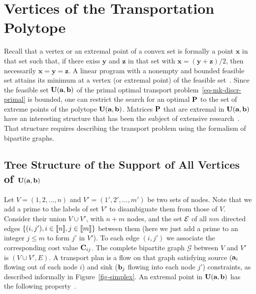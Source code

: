 
\section{Vertices of the Transportation Polytope}\label{s-extremal}

Recall that a vertex or an extremal point of a convex set is formally a point $\mathbf{x}$ in that set such that, if there exiss $\mathbf{y}$ and $\mathbf{z}$ in that set with $\mathbf{x}=(\mathbf{y}+\mathbf{z})/2$, then necessarily $\mathbf{x}=\mathbf{y}=\mathbf{z}$. A linear program with a nonempty and bounded feasible set attains its minimum at a vertex (or extremal point) of the feasible set~\citep[p.~65, Theo.~2.7]{bertsimas1997introduction}. Since the feasible set $\CouplingsD(\a,\b)$ of the primal optimal transport problem~\eqref{eq-mk-discr-primal} is bounded, one can restrict the search for an optimal $\P$ to the set of extreme points of the polytope $\CouplingsD(\a,\b)$. Matrices $\P$ that are extremal in $\CouplingsD(\a,\b)$ have an interesting structure that has been the subject of extensive research~\citep[\S8]{brualdi2006combinatorial}. That structure requires describing the transport problem using the formalism of bipartite graphs.
 
\subsection{Tree Structure of the Support of All Vertices of $\CouplingsD(\a,\b)$} 
Let $V=(1,2,\dots,n)$ and $V'=(1',2',\dots,m')$ be two sets of nodes. Note that we add a prime to the labels of set $V'$ to disambiguate them from those of $V$. Consider their union $V\cup V'$, with $n+m$ nodes, and the set $\alledges$ of all $nm$ directed edges $\{ (i,j'), i \in \range{n}, j\in \range{m}\}$ between them (here we just add a prime to an integer $j\leq m$ to form $j'$ in $V'$). To each edge $(i,j')$ we associate the corresponding cost value $\C_{ij}$. The complete bipartite graph $\mathcal{G}$ between $V$ and $V'$ is $(V\cup V',E)$. A transport plan is a flow on that graph satisfying source ($\a_i$ flowing out of each node $i$) and sink ($\b_j$ flowing into each node $j'$) constraints, as described informally in Figure~\ref{fig-simplex}. An extremal point in $\CouplingsD(\a,\b)$ has the following property~\citep[p.~338,~Theo.~8.1.2]{brualdi2006combinatorial}.

